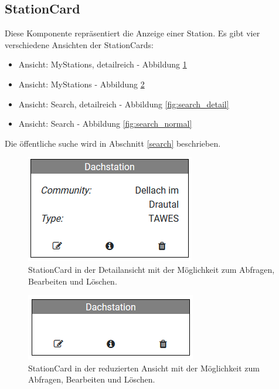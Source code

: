 \documentclass[12pt, letterpaper]{article}
\begin{document}
\newpage
\subsection{StationCard}
\label{stationcards}

Diese Komponente repräsentiert die Anzeige einer Station. Es gibt vier verschiedene Ansichten der StationCards:
\begin{itemize}
    \item Ansicht: MyStations, detailreich - Abbildung \ref{fig:stations_detail}
    \item Ansicht: MyStations - Abbildung \ref{fig:stations_normal}
    \item Ansicht: Search, detailreich - Abbildung \ref{fig:search_detail}
    \item Ansicht: Search - Abbildung \ref{fig:search_normal}
\end{itemize}

Die öffentliche suche wird in Abschnitt \ref{search} beschrieben.

\begin{figure}[H]
    \centering
    \includegraphics[scale=1.0]{img/stations/stations_detail.png}
    \caption{StationCard in der Detailansicht mit der Möglichkeit zum Abfragen, Bearbeiten und Löschen.}
    \label{fig:stations_detail}
\end{figure}

\begin{figure}[H]
    \centering
    \includegraphics[scale=1.0]{img/stations/stations.png}
    \caption{StationCard in der reduzierten Ansicht mit der Möglichkeit zum Abfragen, Bearbeiten und Löschen.}
    \label{fig:stations_normal}
\end{figure}
\end{document}
